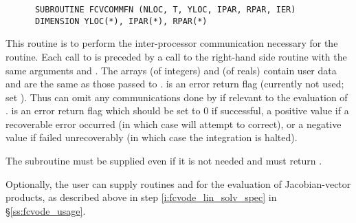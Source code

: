 \begin{Steps}
\begin{verbatim}
      SUBROUTINE FCVCOMMFN (NLOC, T, YLOC, IPAR, RPAR, IER)
      DIMENSION YLOC(*), IPAR(*), RPAR(*)
\end{verbatim}
  This routine is to perform the inter-processor communication necessary
  for the  routine.
  Each call to  is preceded by a call to the right-hand side
  routine  with the same arguments  and .
  The arrays  (of integers) and  (of reals) contain user data
  and are the same as those passed to .
   is an error return flag (currently not used; set ). 
  Thus  can omit any communications done by  if
  relevant to the evaluation of .
   is an error return flag which should be set to $0$ if successful, 
  a positive value if a recoverable error occurred (in which case {\cvode} will 
  attempt to correct), or a negative value if  failed unrecoverably 
  (in which case the integration is halted).


  {\warn}The subroutine  must be supplied even if it is not needed 
  and must return .

  Optionally, the user can supply routines  and
   for the evaluation of Jacobian-vector products, as
  described above in step \ref{i:fcvode_lin_solv_spec} in
  \S\ref{ss:fcvode_usage}.

\end{Steps}

